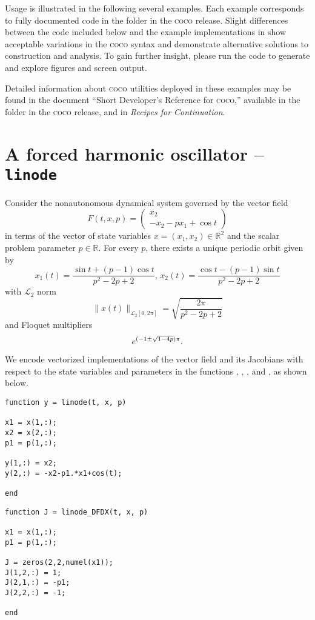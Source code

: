 Usage is illustrated in the following several examples. Each example corresponds to fully documented code in the  folder in the \textsc{coco} release. Slight differences between the code included below and the example implementations in  show acceptable variations in the \textsc{coco} syntax and demonstrate alternative solutions to construction and analysis. To gain further insight, please run the code to generate and explore figures and screen output.

Detailed information about \textsc{coco} utilities deployed in these examples may be found in the document ``Short Developer's Reference for \textsc{coco},'' available in the  folder in the \textsc{coco} release, and in \emph{Recipes for Continuation}.

\section{A forced harmonic oscillator -- \texttt{linode}}
Consider the nonautonomous dynamical system governed by the vector field
\begin{equation}
F(t,x,p) = \left(\begin{array}{c}x_2\\-x_2-px_1+\cos t\end{array}\right)
\end{equation}
in terms of the vector of state variables $x=(x_1,x_2)\in\mathbb{R}^2$ and the scalar problem parameter $p\in\mathbb{R}$. For every $p$, there exists a unique periodic orbit given by
\begin{equation}
x_1(t)=\frac{\sin t+(p-1)\cos t}{p^2-2p+2},\,x_2(t)=\frac{\cos t-(p-1)\sin t}{p^2-2p+2}
\end{equation}
with $\mathcal{L}_2$ norm
\begin{equation}
\|x(t)\|_{\mathcal{L}_2[0,2\pi]}=\sqrt{\frac{2\pi}{p^2-2p+2}}
\end{equation}
and Floquet multipliers
\begin{equation}
e^{(-1\pm\\\sqrt{1-4p})\pi}.
\end{equation}

We encode vectorized implementations of the vector field and its Jacobians with respect to the state variables and parameters in the functions , , , and , as shown below.
\begin{lstlisting}[language=coco-highlight]
function y = linode(t, x, p)

x1 = x(1,:);
x2 = x(2,:);
p1 = p(1,:);

y(1,:) = x2;
y(2,:) = -x2-p1.*x1+cos(t);

end
\end{lstlisting}
\begin{lstlisting}[language=coco-highlight]
function J = linode_DFDX(t, x, p)

x1 = x(1,:);
p1 = p(1,:);

J = zeros(2,2,numel(x1));
J(1,2,:) = 1;
J(2,1,:) = -p1;
J(2,2,:) = -1;

end
\end{lstlisting}

